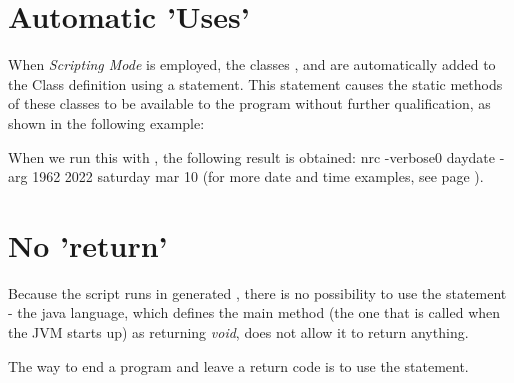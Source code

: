 \section{Automatic 'Uses'}
When \emph{Scripting Mode}  is employed, the classes ,  and  are automatically added to the Class definition using a  statement. This statement causes the static methods of these classes to be available to the program without further qualification, as shown in the following example:

When we run this with , the following result is obtained:
\bash[stdout]
nrc -verbose0 daydate -arg 1962 2022 saturday mar 10
\END
(for more date and time examples, see page
\pageref{refdatetimearith}).


\section{No 'return'}
Because the script runs in generated , there is no
possibility to use the  statement - the java language,
which defines the main method (the one that is called when the JVM
starts up) as returning \emph{void}, does not allow it to return
anything.

The way to end a program and leave a return code is to use the
 statement.

